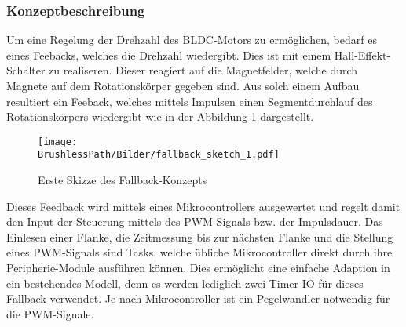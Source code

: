 \subsubsection{Konzeptbeschreibung}
\fi
Um eine Regelung der Drehzahl des BLDC-Motors zu ermöglichen, bedarf es eines
Feebacks, welches die Drehzahl wiedergibt. Dies ist mit einem
Hall-Effekt-Schalter zu realiseren. Dieser reagiert auf die Magnetfelder,
welche durch Magnete auf dem Rotationskörper gegeben sind. Aus solch einem
Aufbau resultiert ein Feeback, welches mittels Impulsen einen Segmentdurchlauf
des Rotationskörpers wiedergibt wie in der Abbildung \ref{fig:fallback-sketch}
dargestellt.
\begin{figure}[h!]
	\centering
	\texttt{[image: \\BrushlessPath/Bilder/fallback\_sketch\_1.pdf]}
	\caption{Erste Skizze des Fallback-Konzepts}
	\label{fig:fallback-sketch}
\end{figure}
Dieses Feedback wird mittels eines Mikrocontrollers ausgewertet und regelt
damit den Input der Steuerung mittels des PWM-Signals bzw. der Impulsdauer.
Das Einlesen einer Flanke, die Zeitmessung bis zur nächsten Flanke und die
Stellung eines PWM-Signals sind Tasks, welche übliche Mikrocontroller direkt
durch ihre Peripherie-Module ausführen können. Dies ermöglicht eine einfache
Adaption in ein bestehendes Modell, denn es werden lediglich zwei Timer-IO
für dieses Fallback verwendet. Je nach Mikrocontroller ist ein Pegelwandler
notwendig für die PWM-Signale.
